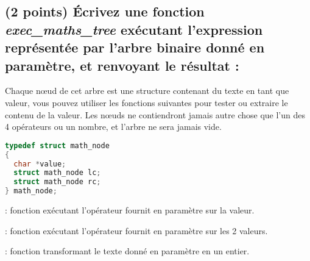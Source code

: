 \documentclass[11pt,a4paper]{article}
\begin{document}
\begin{table}[ht!]
\begin{minipage}{0.50\textwidth}
  \end{minipage}
\end{table}

\vspace*{3cm}


\clearpage


\subsection{(2 points) \'Ecrivez une fonction \og \textit{exec\_maths\_tree} \fg{} exécutant l'expression représentée par l'arbre binaire donné en paramètre, et renvoyant le résultat : }

\noindent Chaque nœud de cet arbre est une structure contenant du texte en tant que valeur, vous pouvez utiliser les fonctions suivantes pour tester ou extraire le contenu de la valeur.
Les nœuds ne contiendront jamais autre chose que l'un des 4 opérateurs ou un nombre, et l'arbre ne sera jamais vide.

\vspace*{-0.5cm}

\begin{center}

\begin{table}[ht!]
  \centering
  \begin{minipage}{0.38\textwidth}
    \centering

\begin{lstlisting}[language=C]
typedef struct math_node
{
  char *value;
  struct math_node lc;
  struct math_node rc;
} math_node; \end{lstlisting}

  \end{minipage}
  \hfillx
  \begin{minipage}{0.57\textwidth}

\noindent {} : fonction exécutant l'opérateur fournit en paramètre sur la valeur.

\smallskip

\noindent {} : fonction exécutant l'opérateur fournit en paramètre sur les 2 valeurs.

\smallskip

\noindent {} : fonction transformant le texte donné en paramètre en un entier.

  \end{minipage}
\end{table}

\end{center}
\end{document}
